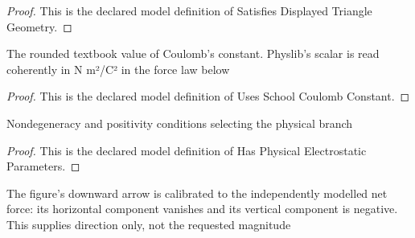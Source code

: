 \begin{proof}
  This is the declared model definition of Satisfies Displayed Triangle Geometry.
\end{proof}
\begin{definition}
  \label{def:physics:phyx-mini-0907:phyxminiproblems-problemphyxmini0907-usesschoolcoulombconstant}
  The rounded textbook value of Coulomb's constant. Physlib's scalar is read coherently in N m²/C² in the force law below
\end{definition}
\begin{proof}
  This is the declared model definition of Uses School Coulomb Constant.
\end{proof}
\begin{definition}
  \label{def:physics:phyx-mini-0907:phyxminiproblems-problemphyxmini0907-hasphysicalelectrostaticparameters}
  Nondegeneracy and positivity conditions selecting the physical branch
\end{definition}
\begin{proof}
  This is the declared model definition of Has Physical Electrostatic Parameters.
\end{proof}
\begin{definition}
  \label{def:physics:phyx-mini-0907:phyxminiproblems-problemphyxmini0907-calibratesdisplayeddownwardforcedirection}
  The figure's downward arrow is calibrated to the independently modelled net force: its horizontal component vanishes and its vertical component is negative. This supplies direction only, not the requested magnitude
\end{definition}
